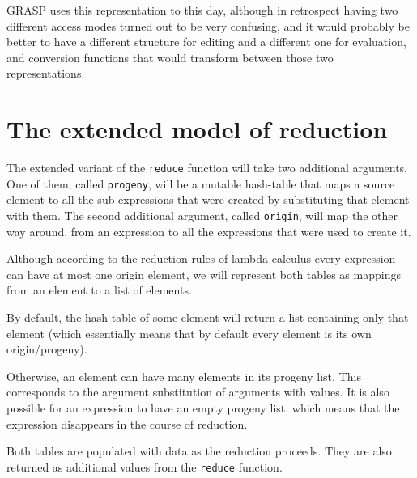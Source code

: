 \documentclass[acmsmall]{acmart}
\begin{document}
GRASP uses this representation to this day, although in retrospect
having two different access modes turned out to be very confusing, and
it would probably be better to have a different structure for editing
and a different one for evaluation, and conversion functions that
would transform between those two representations.

\section{The extended model of reduction}

The extended variant of the \texttt{reduce} function will take two additional
arguments. One of them, called \texttt{progeny}, will be a mutable hash-table
that maps a source element to all the sub-expressions that were created
by substituting that element with them. The second additional
argument, called \texttt{origin}, will map the other way around, from an
expression to all the expressions that were used to create it.

Although according to the reduction rules of lambda-calculus every
expression can have at most one origin element, we will represent both
tables as mappings from an element to a list of elements.

By default, the hash table of some element will return a list
containing only that element (which essentially means that by default
every element is its own origin/progeny).

Otherwise, an element can have many elements in its progeny list.
This corresponds to the argument substitution of arguments with
values.  It is also possible for an expression to have an empty
progeny list, which means that the expression disappears in the course
of reduction.

Both tables are populated with data as the reduction proceeds.  They
are also returned as additional values from the \texttt{reduce} function.
\end{document}
